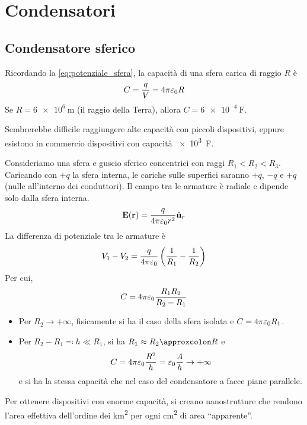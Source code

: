 \section{Condensatori}

\subsection{Condensatore sferico}

Ricordando la \eqref{eq:potenziale_sfera}, la capacità di una sfera carica di raggio $R$ è
\begin{equation}
    C = \frac{q}{V} = 4\pi\varepsilon_0 R
\end{equation}
Se $R = \qty{6e6}{\metre}$ (il raggio della Terra), allora $C = \qty{6e-4}{\farad}$.

Sembrerebbe difficile raggiungere alte capacità con piccoli dispositivi, eppure esistono in commercio dispositivi con capacità \qty{e3}{\farad}.

Consideriamo una sfera e guscio sferico concentrici con raggi $R_1 < R_2 < R_3$.
Caricando con $+q$ la sfera interna, le cariche sulle superfici saranno $+q$, $-q$ e $+q$ (nulle all'interno dei conduttori).
Il campo tra le armature è radiale e dipende solo dalla sfera interna.
\begin{equation}
    \mathbf{E}(\mathbf{r}) = \frac{q}{4\pi\varepsilon_0 r^2} \hat{\mathbf{u}}_{r}
\end{equation}
La differenza di potenziale tra le armature è
\begin{equation}
    V_1 - V_2 = \frac{q}{4\pi\varepsilon_0} \left( \frac{1}{R_1} - \frac{1}{R_2} \right)
\end{equation}
Per cui,
\begin{equation}
    C = 4\pi\varepsilon_0 \frac{R_1 R_2}{R_2 - R_1}
\end{equation}
\begin{itemize}
    \item Per $R_2 \to +\infty$, fisicamente si ha il caso della sfera isolata e $C = 4\pi\varepsilon_0 R_1$.
    \item Per $R_2 - R_1 \eqcolon h \ll R_1$, si ha $R_1 \approx R_2 \approxcolon R$ e
    \begin{equation}
        C = 4\pi\varepsilon_0 \frac{R^2}{h} = \varepsilon_0 \frac{A}{h} \to +\infty
    \end{equation}
    e si ha la stessa capacità che nel caso del condensatore a facce piane parallele.
\end{itemize}

Per ottenere dispositivi con enorme capacità, si creano nanostrutture che rendono l'area effettiva dell'ordine dei \unit{\kilo\metre\squared} per ogni \unit{\centi\metre\squared} di area ``apparente''.

